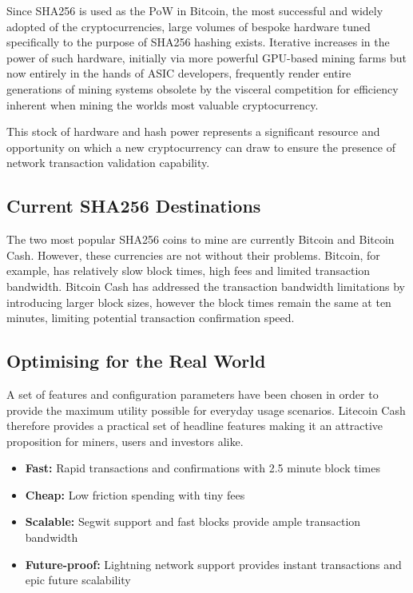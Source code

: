 \documentclass{IOS-Book-Article}
\begin{document}
Since SHA256 is used as the PoW in Bitcoin, the most successful and widely adopted of the cryptocurrencies, large volumes of bespoke hardware tuned
specifically to the purpose of SHA256 hashing exists. Iterative increases in the power of such hardware, initially via more powerful GPU-based mining farms but now entirely in the hands of ASIC developers, frequently render entire generations of mining systems obsolete by the visceral competition for efficiency inherent when mining the worlds most valuable cryptocurrency. 

This stock of hardware and hash power represents a significant resource and opportunity on which
a new cryptocurrency can draw to ensure the presence of network transaction validation capability.

\subsection{Current SHA256 Destinations}

The two most popular SHA256 coins to mine are currently Bitcoin and Bitcoin Cash. However, these currencies are
not without their problems. Bitcoin, for example, has relatively slow block times, high fees and limited transaction bandwidth. Bitcoin Cash has 
addressed the transaction bandwidth limitations by introducing larger block sizes, however the block times remain the same at ten minutes, limiting 
potential transaction confirmation speed.

\subsection{Optimising for the Real World}

A set of features and configuration parameters have been chosen in order to provide the maximum utility possible for everyday usage scenarios. 
Litecoin Cash therefore provides a practical set of headline features making it an attractive proposition for miners, users and investors alike.

\begin{itemize}
  \item \textbf{Fast:} Rapid transactions and confirmations with 2.5 minute block times
  \item \textbf{Cheap:} Low friction spending with tiny fees
  \item \textbf{Scalable:} Segwit support and fast blocks provide ample transaction bandwidth
  \item \textbf{Future-proof:} Lightning network support provides instant transactions and epic future scalability
\end{itemize}
\end{document}

